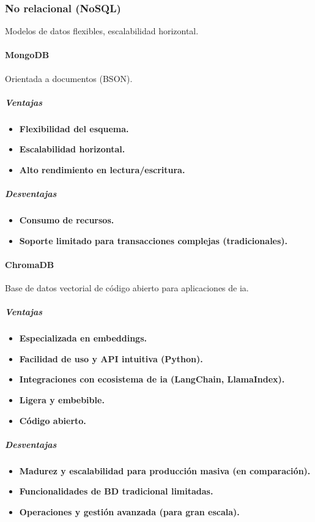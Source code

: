 \subsubsection{No relacional (NoSQL)}
Modelos de datos flexibles, escalabilidad horizontal.

\paragraph{MongoDB}
Orientada a documentos (BSON).
\subparagraph{Ventajas}
\begin{itemize}
    \item \textbf{Flexibilidad del esquema.}
    \item \textbf{Escalabilidad horizontal.}
    \item \textbf{Alto rendimiento en lectura/escritura.}
\end{itemize}
\subparagraph{Desventajas}
\begin{itemize}
    \item \textbf{Consumo de recursos.}
    \item \textbf{Soporte limitado para transacciones complejas (tradicionales).}
\end{itemize}

\paragraph{ChromaDB}
Base de datos vectorial de código abierto para aplicaciones de \gls{ia}.
\subparagraph{Ventajas}
\begin{itemize}
    \item \textbf{Especializada en embeddings.}
    \item \textbf{Facilidad de uso y API intuitiva (Python).}
    \item \textbf{Integraciones con ecosistema de \gls{ia} (LangChain, LlamaIndex).}
    \item \textbf{Ligera y embebible.}
    \item \textbf{Código abierto.}
\end{itemize}
\subparagraph{Desventajas}
\begin{itemize}
    \item \textbf{Madurez y escalabilidad para producción masiva (en comparación).}
    \item \textbf{Funcionalidades de BD tradicional limitadas.}
    \item \textbf{Operaciones y gestión avanzada (para gran escala).}
\end{itemize}

